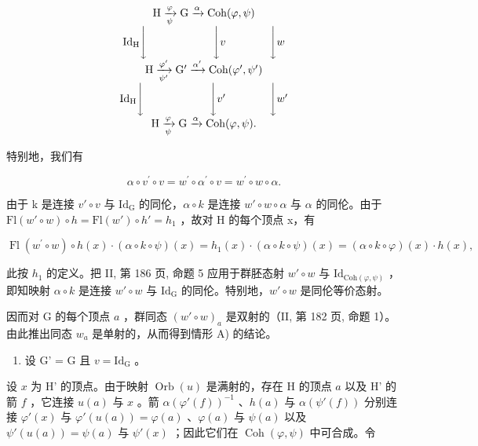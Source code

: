 \[
\begin{array}{c} \mathrm{H} \xrightarrow [ \psi ]{\varphi} \mathrm{G} \xrightarrow {\alpha} \mathrm{Coh} (\varphi , \psi) \\ \mathrm{Id} _ {\mathrm{H}} \Biggl \downarrow \qquad \qquad \qquad \Biggl \downarrow v \qquad \qquad \Biggl \downarrow w \\ \mathrm{H} \xrightarrow [ \psi^ {\prime} ]{\varphi^ {\prime}} \mathrm{G} ^ {\prime} \xrightarrow {\alpha^ {\prime}} \mathrm{Coh} (\varphi^ {\prime}, \psi^ {\prime}) \\ \mathrm{Id} _ {\mathrm{H}} \Biggl \downarrow \qquad \qquad \qquad \Biggl \downarrow v ^ {\prime} \qquad \qquad \Biggl \downarrow w ^ {\prime} \\ \mathrm{H} \xrightarrow [ \psi ]{\varphi} \mathrm{G} \xrightarrow {\alpha} \mathrm{Coh} (\varphi , \psi)  . \end{array}
\]

特别地，我们有

\[
\alpha \circ v ^ {\prime} \circ v = w ^ {\prime} \circ \alpha^ {\prime} \circ v = w ^ {\prime} \circ w \circ \alpha .
\]

由于 k 是连接 \(v'\circ v\) 与 \(\mathrm{Id}_{\mathrm{G}}\) 的同伦，\(\alpha\circ k\) 是连接 \(w'\circ w\circ\alpha\) 与 \(\alpha\) 的同伦。由于 \(\mathrm{Fl}(w'\circ w)\circ h=\mathrm{Fl}(w')\circ h'=h_{1}\) ，故对 H 的每个顶点 x，有

\[
\operatorname{Fl} \left(w ^ {\prime} \circ w\right) \circ h (x) \cdot (\alpha \circ k \circ \psi) (x) = h _ {1} (x) \cdot (\alpha \circ k \circ \psi) (x) = (\alpha \circ k \circ \varphi) (x) \cdot h (x),
\]

此按 \(h_1\) 的定义。把 II, 第 186 页, 命题 5 应用于群胚态射 \(w' \circ w\) 与 \(\mathrm{Id}_{\mathrm{Coh}(\varphi, \psi)}\) ，即知映射 \(\alpha \circ k\) 是连接 \(w' \circ w\) 与 \(\mathrm{Id}_{\mathrm{G}}\) 的同伦。特别地，\(w' \circ w\) 是同伦等价态射。

因而对 G 的每个顶点 \(a\) ，群同态 \((w' \circ w)_a\) 是双射的（II, 第 182 页, 命题 1）。由此推出同态 \(w_a\) 是单射的，从而得到情形 A) 的结论。

\begin{enumerate}
\def\labelenumi{\arabic{enumi})}
\setcounter{enumi}{1}
\tightlist
\item
  设 G' = G 且 \(v = \mathrm{Id}_{\mathrm{G}}\) 。
\end{enumerate}

设 \(x\) 为 H' 的顶点。由于映射 \(\operatorname{Orb}(u)\) 是满射的，存在 H 的顶点 \(a\) 以及 H' 的箭 \(f\) ，它连接 \(u(a)\) 与 \(x\) 。箭 \(\alpha(\varphi'(f))^{-1}\) 、\(h(a)\) 与 \(\alpha(\psi'(f))\) 分别连接 \(\varphi'(x)\) 与 \(\varphi'(u(a)) = \varphi(a)\) 、\(\varphi(a)\) 与 \(\psi(a)\) 以及 \(\psi'(u(a)) = \psi(a)\) 与 \(\psi'(x)\) ；因此它们在 \(\operatorname{Coh}(\varphi, \psi)\) 中可合成。令

